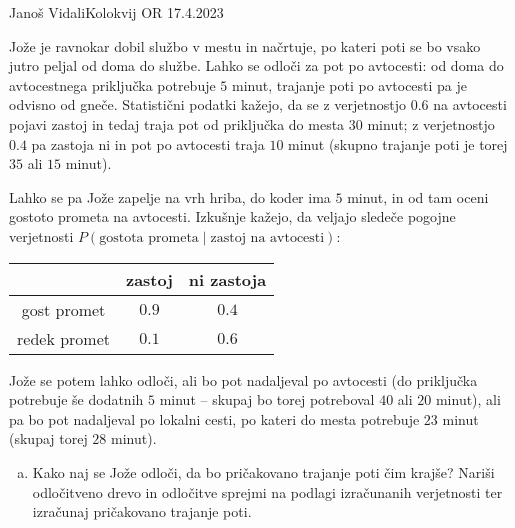 \begin{naloga}{Janoš Vidali}{Kolokvij OR 17.4.2023}
\begin{vprasanje}
Jože je ravnokar dobil službo v mestu in načrtuje,
po kateri poti se bo vsako jutro peljal od doma do službe.
Lahko se odloči za pot po avtocesti:
od doma do avtocestnega priključka potrebuje $5$ minut,
trajanje poti po avtocesti pa je odvisno od gneče.
Statistični podatki kažejo,
da se z verjetnostjo $0.6$ na avtocesti pojavi zastoj
in tedaj traja pot od priključka do mesta $30$ minut;
z verjetnostjo $0.4$ pa zastoja ni
in pot po avtocesti traja $10$ minut
(skupno trajanje poti je torej $35$ ali $15$ minut).

Lahko se pa Jože zapelje na vrh hriba, do koder ima $5$ minut,
in od tam oceni gostoto prometa na avtocesti.
Izkušnje kažejo, da veljajo sledeče pogojne verjetnosti
$P(\text{gostota prometa} \mid \text{zastoj na avtocesti})$:
\begin{center}
\begin{tabular}{c|cc}
& zastoj & ni zastoja \\
\hline
gost promet & $0.9$ & $0.4$ \\
redek promet & $0.1$ & $0.6$
\end{tabular}
\end{center}
Jože se potem lahko odloči, ali bo pot nadaljeval po avtocesti
(do priključka potrebuje še dodatnih $5$ minut
-- skupaj bo torej potreboval $40$ ali $20$ minut),
ali pa bo pot nadaljeval po lokalni cesti,
po kateri do mesta potrebuje $23$ minut
(skupaj torej $28$ minut).

\begin{enumerate}[(a)]
\item Kako naj se Jože odloči, da bo pričakovano trajanje poti čim krajše?
Nariši odločitveno drevo in odločitve sprejmi na podlagi izračunanih verjetnosti
ter izračunaj pričakovano trajanje poti.


\end{enumerate}
\end{vprasanje}
\end{naloga}
